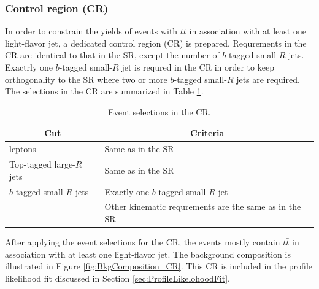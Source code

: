 \subsubsection{Control region (CR)}
\label{subsec:EventSelection_CR}
In order to constrain the yields of events with $t\bar{t}$ in association with at least one light-flavor jet, a dedicated control region (CR) is prepared.
Requrements in the CR are identical to that in the SR, except the number of $b$-tagged small-$R$ jets. Exactrly one $b$-tagged small-$R$ jet is requred in the CR in order to keep orthogonality to the SR where two or more $b$-tagged small-$R$ jets are required. The selections in the CR are summarized in Table \ref{tab:EventSelectionInCR}. 

\begin{table}[H]
  \centering
  \begin{tabular*}{150mm}{ll}
    \hline\hline
    \multicolumn{1}{c}{Cut}   & \multicolumn{1}{c}{Criteria}\\
    \hline
    leptons                   & \multicolumn{1}{l}{Same as in the SR}\\
    \hline
    Top-tagged large-$R$ jets & \multicolumn{1}{l}{Same as in the SR}\\
    \hline
    $b$-tagged small-$R$ jets & \multicolumn{1}{l}{Exactly one $b$-tagged small-$R$ jet}\\
                              & \multicolumn{1}{l}{Other kinematic requrements are the same as in the SR}\\
    \hline\hline
  \end{tabular*}
  \caption{Event selections in the CR.}
  \label{tab:EventSelectionInCR}
\end{table}

After applying the event selections for the CR, the events mostly contain $t\bar{t}$ in association with at least one light-flavor jet. The background composition is illustrated in Figure \ref{fig:BkgComposition_CR}. 
This CR is included in the profile likelihood fit discussed in Section \ref{sec:ProfileLikelohoodFit}. 

